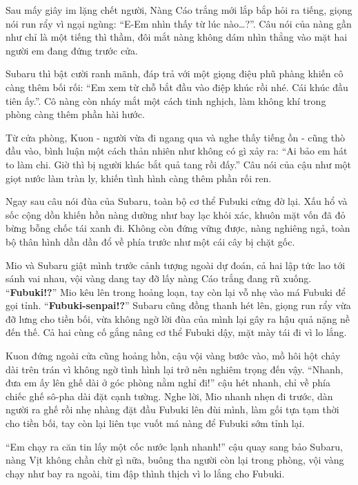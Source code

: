 \documentclass[../main.tex]{subfiles}
\begin{document}

Sau mấy giây im lặng chết người, Nàng Cáo trắng mới lắp bắp hỏi ra tiếng, giọng nói run rẩy vì ngại ngùng: ``E-Em nhìn thấy từ lúc nào\dots?''. Câu nói của nàng gần như chỉ là một tiếng thì thầm, đôi mắt nàng không dám nhìn thẳng vào mặt hai người em đang đứng trước cửa.

Subaru thì bật cười ranh mãnh, đáp trả với một giọng điệu phũ phàng khiến cô càng thêm bối rối: ``Em xem từ chỗ bắt đầu vào điệp khúc rồi nhé. Cái khúc đầu tiên ấy.''. Cô nàng còn nháy mắt một cách tinh nghịch, làm không khí trong phòng càng thêm phần hài hước.

Từ cửa phòng, Kuon - người vừa đi ngang qua và nghe thấy tiếng ồn - cũng thò đầu vào, bình luận một cách thản nhiên như không có gì xảy ra: ``Ai bảo em hát to làm chi. Giờ thì bị người khác bắt quả tang rồi đấy.'' Câu nói của cậu như một giọt nước làm tràn ly, khiến tình hình càng thêm phần rối ren.

Ngay sau câu nói đùa của Subaru, toàn bộ cơ thể Fubuki cứng đờ lại. Xấu hổ và sốc cộng dồn khiến hồn nàng dường như bay lạc khỏi xác, khuôn mặt vốn đã đỏ bừng bỗng chốc tái xanh đi. Không còn đứng vững được, nàng nghiêng ngả, toàn bộ thân hình dần dần đổ về phía trước như một cái cây bị chặt gốc.

Mio và Subaru giật mình trước cảnh tượng ngoài dự đoán, cả hai lập tức lao tới sánh vai nhau, vội vàng dang tay đỡ lấy nàng Cáo trắng đang rũ xuống. ``\textbf{Fubuki!?}'' Mio kêu lên trong hoảng loạn, tay còn lại vỗ nhẹ vào má Fubuki để gọi tỉnh. ``\textbf{Fubuki-senpai!?}'' Subaru cũng đồng thanh hét lên, giọng run rẩy vừa đỡ lưng cho tiền bối, vừa không ngờ lời đùa của mình lại gây ra hậu quả nặng nề đến thế. Cả hai cùng cố gắng nâng cơ thể Fubuki dậy, mặt mày tái đi vì lo lắng.


Kuon đứng ngoài cửa cũng hoảng hồn, cậu vội vàng bước vào, mồ hôi hột chảy dài trên trán vì không ngờ tình hình lại trở nên nghiêm trọng đến vậy. ``Nhanh, đưa em ấy lên ghế dài ở góc phòng nằm nghỉ đi!'' cậu hét nhanh, chỉ về phía chiếc ghế sô-pha dài đặt cạnh tường. Nghe lời, Mio nhanh nhẹn đi trước, dàn người ra ghế rồi nhẹ nhàng đặt đầu Fubuki lên đùi mình, làm gối tựa tạm thời cho tiền bối, tay còn lại liên tục vuốt má nàng để Fubuki sớm tỉnh lại.

``Em chạy ra căn tin lấy một cốc nước lạnh nhanh!'' cậu quay sang bảo Subaru, nàng Vịt không chần chừ gì nữa, buông tha người còn lại trong phòng, vội vàng chạy như bay ra ngoài, tim đập thình thịch vì lo lắng cho Fubuki.
\end{document}
